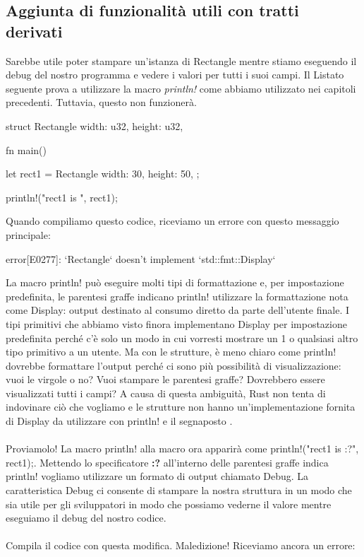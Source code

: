 \documentclass[11pt,a4paper]{article}
\begin{document}
\subsection{Aggiunta di funzionalità utili con tratti derivati}
Sarebbe utile poter stampare un'istanza di Rectangle mentre stiamo eseguendo il debug del nostro programma e vedere i valori per tutti i suoi campi. Il Listato seguente prova a utilizzare la macro \textit{println!} come abbiamo utilizzato nei capitoli precedenti. Tuttavia, questo non funzionerà.
\begin{rust}
struct Rectangle {
    width: u32,
    height: u32,
}

fn main() {
    let rect1 = Rectangle {
        width: 30,
        height: 50,
    };

    println!("rect1 is {}", rect1);
}
\end{rust}
Quando compiliamo questo codice, riceviamo un errore con questo messaggio principale:
\begin{rust}
error[E0277]: `Rectangle` doesn't implement `std::fmt::Display`
\end{rust}
La macro println! può eseguire molti tipi di formattazione e, per impostazione predefinita, le parentesi graffe indicano println! utilizzare la formattazione nota come Display: output destinato al consumo diretto da parte dell'utente finale. I tipi primitivi che abbiamo visto finora implementano Display per impostazione predefinita perché c'è solo un modo in cui vorresti mostrare un 1 o qualsiasi altro tipo primitivo a un utente. Ma con le strutture, è meno chiaro come println! dovrebbe formattare l'output perché ci sono più possibilità di visualizzazione: vuoi le virgole o no? Vuoi stampare le parentesi graffe? Dovrebbero essere visualizzati tutti i campi? A causa di questa ambiguità, Rust non tenta di indovinare ciò che vogliamo e le strutture non hanno un'implementazione fornita di Display da utilizzare con println! e il segnaposto {}.\\
\\
Proviamolo! La macro println! alla macro ora apparirà come println!("rect1 is {:?}", rect1);. Mettendo lo specificatore \textbf{:?} all'interno delle parentesi graffe indica println! vogliamo utilizzare un formato di output chiamato Debug. La caratteristica Debug ci consente di stampare la nostra struttura in un modo che sia utile per gli sviluppatori in modo che possiamo vederne il valore mentre eseguiamo il debug del nostro codice.\\
\\
Compila il codice con questa modifica. Maledizione! Riceviamo ancora un errore:
\end{document}
